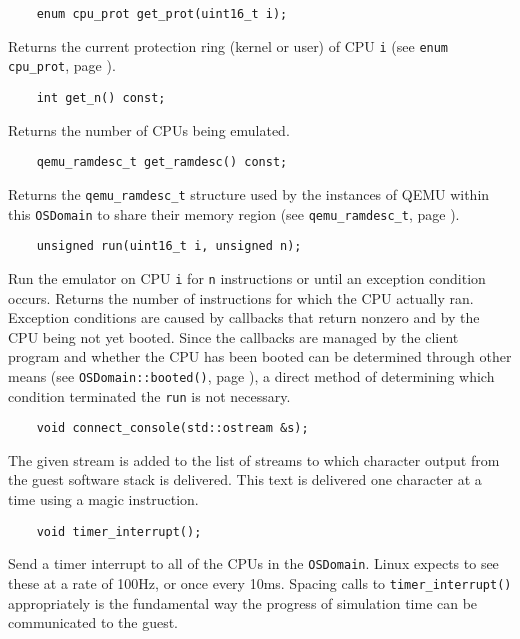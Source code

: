 \documentclass[letterpaper, 10pt]{book}
\begin{document}
\label{func:get_proc} \begin{verbatim}
    enum cpu_prot get_prot(uint16_t i);
\end{verbatim}
Returns the current protection ring (kernel or user) of CPU \texttt{i} (see
\texttt{enum cpu\_prot}, page \pageref{enum:cpu_prot}).

\label{func:get_n} \begin{verbatim}
    int get_n() const;
\end{verbatim}
Returns the number of CPUs being emulated.

\label{func:get_ramdesc} \begin{verbatim}
    qemu_ramdesc_t get_ramdesc() const;
\end{verbatim}
Returns the \texttt{qemu\_ramdesc\_t} structure used by the instances of QEMU
within this \texttt{OSDomain} to share their memory region (see 
\texttt{qemu\_ramdesc\_t}, page \pageref{struct:qemu_ramdesc_t}).

\label{func:run} \begin{verbatim}
    unsigned run(uint16_t i, unsigned n);
\end{verbatim}
Run the emulator on CPU \texttt{i} for \texttt{n} instructions or until an
exception condition occurs. Returns the number of instructions for which the
CPU actually ran. Exception conditions are caused by callbacks that return
nonzero and by the CPU being not yet booted. Since the callbacks are managed by
the client program and whether the CPU has been booted can be determined
through other means (see \texttt{OSDomain::booted()}, page 
\pageref{func:booted}), a direct method of determining which condition
terminated the \texttt{run} is not necessary.

\label{func:connect_console} \begin{verbatim}
    void connect_console(std::ostream &s);
\end{verbatim}
The given stream is added to the list of streams to which character output from
the guest software stack is delivered. This text is delivered one character at
a time using a magic instruction.

\label{func:timer_interrupt} \begin{verbatim}
    void timer_interrupt();
\end{verbatim}
Send a timer interrupt to all of the CPUs in the \texttt{OSDomain}. Linux
expects to see these at a rate of 100Hz, or once every 10ms. Spacing calls to
\texttt{timer\_interrupt()} appropriately is the fundamental way the progress
of simulation time can be communicated to the guest.
\end{document}
